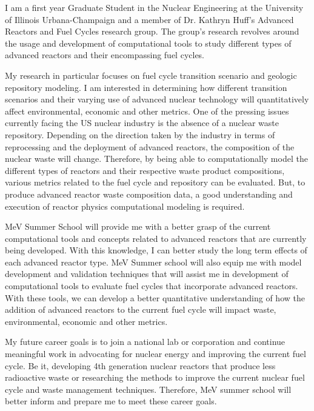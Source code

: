 \documentclass{resume2} %
\begin{document}
\vspace{1cm}
\onehalfspacing

I am a first year Graduate Student in the Nuclear Engineering at the University of Illinois Urbana-Champaign and a member of Dr. Kathryn Huff's Advanced Reactors and Fuel Cycles research group. The group's research revolves around the usage and development of computational tools to study different types of advanced reactors and their encompassing fuel cycles. 

My research in particular focuses on fuel cycle transition scenario and geologic repository modeling. I am interested in determining how different transition scenarios and their varying use of advanced nuclear technology will quantitatively affect environmental, economic and other metrics.  One of the pressing issues currently facing the US nuclear industry is the absence of a nuclear waste repository. Depending on the direction taken by the industry in terms of reprocessing and the deployment of advanced reactors, the composition of the nuclear waste will change. Therefore, by being able to computationally model the different types of reactors and their respective waste product compositions, various metrics related to the fuel cycle and repository can be evaluated. But, to produce advanced reactor waste composition data, a good understanding and execution of reactor physics computational modeling is required. 

MeV Summer School will provide me with a better grasp of the current computational tools and concepts related to advanced reactors that are currently being developed. With this knowledge, I can better study the long term effects of each advanced reactor type. MeV Summer school will also equip me with model development and validation techniques that will assist me in development of computational tools to evaluate fuel cycles that incorporate advanced reactors. With these tools, we can develop a better quantitative understanding of how the addition of advanced reactors to the current fuel cycle will impact waste, environmental, economic and other metrics.

My future career goals is to join a national lab or corporation and continue meaningful work in advocating for nuclear energy and improving the current fuel cycle. Be it, developing 4th generation nuclear reactors that produce less radioactive waste or researching the methods to improve the current nuclear fuel cycle and waste management techniques. Therefore, MeV summer school will better inform and prepare me to meet these career goals. 
\end{document}
